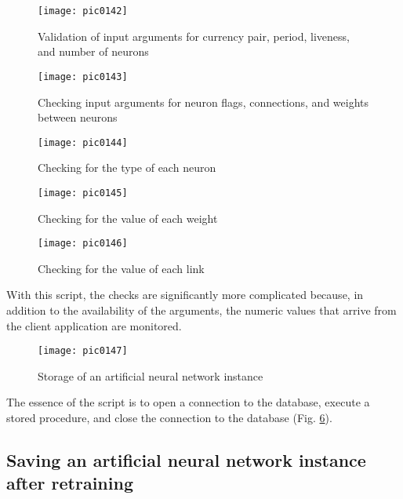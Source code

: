 \begin{figure}[h]
\centering
\texttt{[image: pic0142]}
\caption{Validation of input arguments for currency pair, period, liveness, and number of neurons}
\label{fig:pic0142}
\end{figure}
\FloatBarrier

\begin{figure}[h]
\centering
\texttt{[image: pic0143]}
\caption{Checking input arguments for neuron flags, connections, and weights between neurons}
\label{fig:pic0143}
\end{figure}
\FloatBarrier

\begin{figure}[h]
\centering
\texttt{[image: pic0144]}
\caption{Checking for the type of each neuron}
\label{fig:pic0144}
\end{figure}
\FloatBarrier

\begin{figure}[h]
\centering
\texttt{[image: pic0145]}
\caption{Checking for the value of each weight}
\label{fig:pic0145}
\end{figure}
\FloatBarrier

\begin{figure}[h]
\centering
\texttt{[image: pic0146]}
\caption{Checking for the value of each link}
\label{fig:pic0146}
\end{figure}
\FloatBarrier

With this script, the checks are significantly more complicated because, in addition to the availability of the arguments, the numeric values that arrive from the client application are monitored.

\begin{figure}[h]
\centering
\texttt{[image: pic0147]}
\caption{Storage of an artificial neural network instance}
\label{fig:pic0147}
\end{figure}
\FloatBarrier

The essence of the script is to open a connection to the database, execute a stored procedure, and close the connection to the database (Fig. \ref{fig:pic0147}).

\subsection{Saving an artificial neural network instance after retraining}

